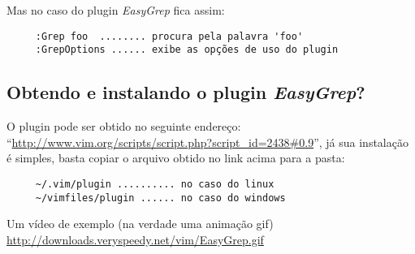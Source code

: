 Mas no caso do plugin {\em EasyGrep} fica assim:

\begin{verbatim}
     :Grep foo  ........ procura pela palavra 'foo'
     :GrepOptions ...... exibe as opções de uso do plugin
\end{verbatim}

\subsection{Obtendo e instalando o plugin {\em EasyGrep}?}
O plugin pode ser obtido no seguinte endereço: 
``\url{http://www.vim.org/scripts/script.php?script_id=2438#0.9}'', já sua instalação
é simples, basta copiar o arquivo obtido no link acima para a pasta:
   
\begin{verbatim}
     ~/.vim/plugin .......... no caso do linux
     ~/vimfiles/plugin ...... no caso do windows
\end{verbatim}

Um vídeo de exemplo (na verdade uma animação gif)
\url{http://downloads.veryspeedy.net/vim/EasyGrep.gif}

